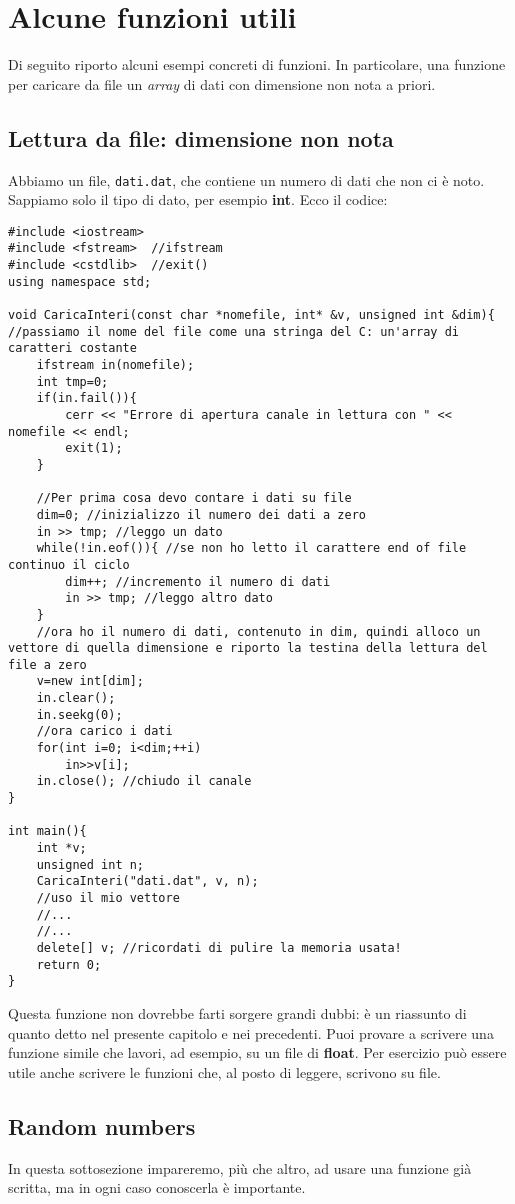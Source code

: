\section{Alcune funzioni utili}
Di seguito riporto alcuni esempi concreti di funzioni. In particolare, una funzione per caricare da file un \emph{array} di dati con dimensione non nota a priori.
\subsection{Lettura da file: dimensione non nota}\label{dimnon}
Abbiamo un file, \verb|dati.dat|, che contiene un numero di dati che non ci è noto. Sappiamo solo il tipo di dato, per esempio \textbf{int}. Ecco il codice:
\begin{lstlisting}
#include <iostream>
#include <fstream>	//ifstream
#include <cstdlib>	//exit()
using namespace std;

void CaricaInteri(const char *nomefile, int* &v, unsigned int &dim){ //passiamo il nome del file come una stringa del C: un'array di caratteri costante
	ifstream in(nomefile);
	int tmp=0; 
	if(in.fail()){
		cerr << "Errore di apertura canale in lettura con " << nomefile << endl;
		exit(1);
	}
	
	//Per prima cosa devo contare i dati su file
	dim=0; //inizializzo il numero dei dati a zero
	in >> tmp; //leggo un dato
	while(!in.eof()){ //se non ho letto il carattere end of file continuo il ciclo
		dim++; //incremento il numero di dati
		in >> tmp; //leggo altro dato
	}
	//ora ho il numero di dati, contenuto in dim, quindi alloco un vettore di quella dimensione e riporto la testina della lettura del file a zero
	v=new int[dim];
	in.clear();
	in.seekg(0);
	//ora carico i dati
	for(int i=0; i<dim;++i)
		in>>v[i];
	in.close(); //chiudo il canale	
}

int main(){
	int *v;
	unsigned int n;
	CaricaInteri("dati.dat", v, n);
	//uso il mio vettore
	//...
	//...
	delete[] v; //ricordati di pulire la memoria usata!
	return 0;
}
\end{lstlisting}

Questa funzione non dovrebbe farti sorgere grandi dubbi: è un riassunto di quanto detto nel presente capitolo e nei precedenti. Puoi provare a scrivere una funzione simile che lavori, ad esempio, su un file di \textbf{float}. Per esercizio può essere utile anche scrivere le funzioni che, al posto di leggere, scrivono su file.
\subsection{Random numbers}
In questa sottosezione impareremo, più che altro, ad usare una funzione già scritta, ma in ogni caso conoscerla è importante.\\

